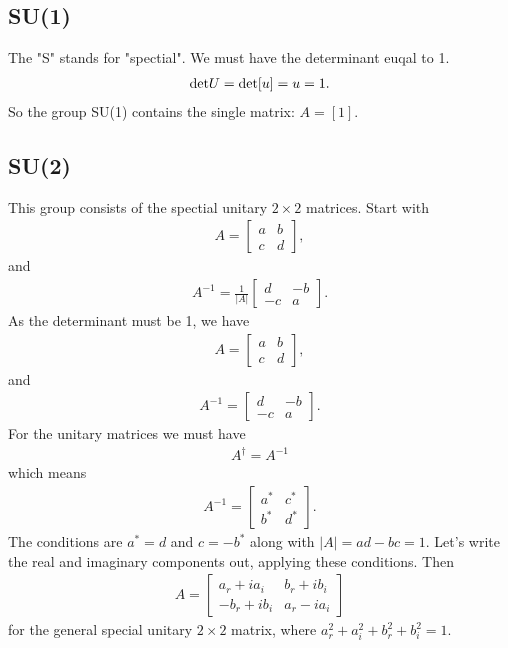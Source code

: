 \documentclass[../../note.tex]{subfiles}
\begin{document}
\subsection{SU(1)}
The "S" stands for "spectial". We must have the determinant euqal to 1.
\begin{align}
    {\rm det}U = {\rm det}[u] = u = 1.
\end{align}
So the group SU(1) contains the single matrix: $A = [1]$.

\subsection{SU(2)}
This group consists of the spectial unitary $2 \times 2$ matrices. Start with
\begin{align}
    A=
    \left[\begin{matrix}
     a & b \\
     c & d   
    \end{matrix}\right],
\end{align}
and 
\begin{align}
    A^{-1}= \frac{1}{\vert A \vert}
    \left[\begin{matrix}
     d & -b \\
     -c & a   
    \end{matrix}\right].
\end{align}
As the determinant must be 1, we have
\begin{align}
    A=
    \left[\begin{matrix}
     a & b \\
     c & d   
    \end{matrix}\right],
\end{align}
and 
\begin{align}
    A^{-1}= 
    \left[\begin{matrix}
     d & -b \\
     -c & a   
    \end{matrix}\right].
\end{align}
For the unitary matrices we must have
\begin{align}
    A^\dagger = A^{-1}
\end{align}
which means 
\begin{align}
    A^{-1} = 
    \left[\begin{matrix}
        a^\ast & c^\ast \\
        b^\ast & d^\ast   
       \end{matrix}\right].
\end{align}
The conditions are $a^\ast = d$ and $c = -b^\ast$ along with $\vert A \vert = ad - bc = 1$. Let's write the real and imaginary  components out, applying these conditions. Then
\begin{align}
    A=
    \left[\begin{matrix}
        a_r + i a_i & b_r + i b_i \\
        -b_r + i b_i & a_r - i a_i   
       \end{matrix}\right]
\end{align}
for the general special unitary $2 \times 2$ matrix, where $a_r^2 + a_i^2 + b_r^2 + b_i^2 = 1$.
\end{document}
